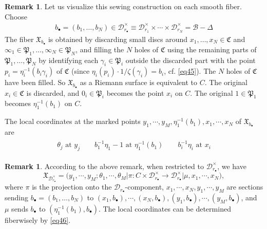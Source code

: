 \documentclass[11pt,b5paper,notitlepage]{article}
\theoremstyle{definition}
\newtheorem{rem}[df]{Remark}
\theoremstyle{plain}
\newcommand{\fk}{\mathfrak}
\newcommand{\mc}{\mathcal}
\newcommand{\blt}{\bullet}
\newcommand{\<}{\left\langle}
\renewcommand{\>}{\right\rangle}
\newcommand{\fx}{\mathfrak{X}}
\newcommand{\MD}{\mathcal{D}}
\numberwithin{equation}{section}
\begin{document}
\begin{rem}
Let us visualize this sewing construction on each smooth fiber. Choose
\begin{align*}
b_\blt=(b_1,\dots,b_N)\in\mc D_{r_\blt}^\times\equiv\mc D_{r_1}^\times\times\cdots\times\mc D_{r_N}^\times=\mc B-\Delta
\end{align*}
The fiber $\fk X_{b_\blt}$ is obtained by discarding small discs around $x_1,\dots,x_N\in\fk C$ and $\infty_1\in\fk P_1,\dots,\infty_N\in\fk P_N$, and filling the $N$ holes of $\fk C$ using the remaining parts of $\fk P_1,\dots,\fk P_N$ by identifying each $\gamma_i\in\fk P_i$ outside the discarded part with the point $p_i=\eta_i^{-1}(b_i\gamma_i)$ of $\fk C$ (since $\eta_i(p_i)\cdot 1/\zeta(\gamma_i)=b_i$, cf. \eqref{eq45}). The $N$ holes of $\fk C$ have been filled. So $\fk X_{b_\blt}$ as a Riemann surface is equivalent to $C$. The original $x_i\in\fk C$ is discarded, and $0_i\in\fk P_i$ becomes the point $x_i$ on $C$. The original $1\in\fk P_1$ becomes $\eta_1^{-1}(b_1)$ on $C$.

The local coordinates at the marked points $y_1,\cdots,y_M,\eta_1^{-1}(b_1),x_1,\cdots,x_N$ of $\fk X_{b_\blt}$ are
\begin{gather}\label{eq46}
\begin{gathered}
\theta_j\text{ at }y_j\qquad b_1^{-1}\eta_1-1\text{ at }\eta_1^{-1}(b_1)\qquad b_i^{-1}\eta_i\text{ at }x_i
\end{gathered}
\end{gather}
\end{rem}

\begin{rem}
According to the above remark, when restricted to $\mc D_{r_\blt}^\times$, we have
    $$
    \fx_{\MD_{r_\blt}^\times}=\big(y_1,\cdots,y_M;\theta_1,\cdots,\theta_M\big|\pi:C\times \MD_{r_\blt}^\times \rightarrow \MD_{r_\blt }^\times\big|\mu,x_1,\cdots,x_N\big),
    $$
    where $\pi$ is the projection onto the $\MD_{r_\blt}$-component, $x_1,\cdots,x_N,y_1,\cdots,y_M$ are sections sending $b_\blt=(b_1,\dots,b_N)$ to $(x_1,b_\blt),\cdots,(x_N,b_\blt),(y_1,b_\blt),\cdots,(y_M,b_\blt)$, and $\mu$ sends $b_\blt$ to $(\eta_1^{-1}(b_1),b_\blt)$. The local coordinates can be determined fiberwisely by \eqref{eq46}.
\end{rem}
\end{document}

